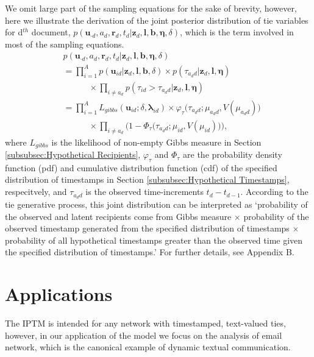 \documentclass[twoside]{article}
\begin{document}
   We omit large part of the sampling equations for the sake of brevity, however, here we illustrate the derivation of the joint posterior distribution of tie variables for d$^{th}$ document, $p(\boldsymbol{u}_{\cdot d}, a_d, \boldsymbol{r}_d, t_d|\boldsymbol{z}_d,\boldsymbol{l}, \boldsymbol{b}, \boldsymbol{\eta}, \delta)$, which is the term involved in most of the sampling equations. 
  \begin{equation*}
  \begin{aligned}
  &p(\boldsymbol{u}_{\cdot d}, a_d, \boldsymbol{r}_d, t_d|\boldsymbol{z}_d,\boldsymbol{l}, \boldsymbol{b}, \boldsymbol{\eta}, \delta) \\&= \prod_{i=1}^A p(\boldsymbol{u}_{id}|\boldsymbol{z}_d,\boldsymbol{l}, \boldsymbol{b}, \delta)\times p(\tau_{a_d d}|\boldsymbol{z}_d,\boldsymbol{l}, \boldsymbol{\eta})\\&\quad\quad\quad \times \prod_{i\neq a_d} p(\tau_{id} >\tau_{a_d d}|\boldsymbol{z}_d,\boldsymbol{l}, \boldsymbol{\eta}) \\& 
  = \prod_{i=1}^A L_{gibbs}(\boldsymbol{u}_{id}; \delta, \boldsymbol{\lambda}_{id} )\times \varphi_{\tau}\big(\tau_{a_d d}; \mu_{a_d d}, V(\mu_{a_d d})\big)\\&\quad\quad\quad \times  \prod_{i\neq a_d}\Big(1-\Phi_{\tau} \big(\tau_{a_d d}; \mu_{i d}, V(\mu_{i d})\big) \Big),
  \end{aligned}
    \label{eqn:tieposterior}
\end{equation*}  
  where $L_{gibbs}$ is the likelihood of non-empty Gibbs measure in Section \ref{subsubsec:Hypothetical Recipients}, $\varphi_\tau$ and $\Phi_\tau$ are the probability density function (pdf) and cumulative distribution function (cdf) of the specified distribution of timestamps in Section \ref{subsubsec:Hypothetical Timestamps}, respecitvely, and $\tau_{a_d d}$ is the observed time-increments $t_d - t_{d-1}$. According to the tie generative process, this joint distribution can be interpreted as `probability of the observed and latent recipients come from Gibbs measure $\times$ probability of the observed timestamp generated from the specified distribution of timestamps $\times$ probability of all hypothetical timestamps greater than the observed time given the specified distribution of timestamps.' For further details, see Appendix B.
\section{Applications}\label{sec:Application}
The IPTM is intended for any network with timestamped, text-valued ties, however, in our application of the model we focus on the analysis of email network, which is the canonical example of dynamic textual communication. 
\end{document}
